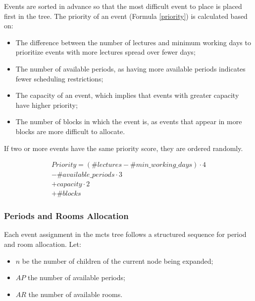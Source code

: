 Events are sorted in advance so that the most difficult event to place is placed first in the tree. The priority of an event (Formula \ref{priority}) is calculated based on:

\begin{itemize}
\item The difference between the number of lectures and minimum working days to prioritize events with more lectures spread over fewer days;
\item The number of available periods, as having more available periods indicates fewer scheduling restrictions;
\item The capacity of an event, which implies that events with greater capacity have higher priority;
\item The number of blocks in which the event is, as events that appear in more blocks are more difficult to allocate.
\end{itemize}

If two or more events have the same priority score, they are ordered randomly.

\begin{equation}
  \begin{aligned}
	Priority = (\#lectures - \#min\_working\_days) \cdot 4 \\
	           - \#available\_periods \cdot 3 \\
	          + capacity \cdot 2 \\
	          + \#blocks\label{priority}
  \end{aligned}
\end{equation}


\subsubsection{Periods and Rooms Allocation}

Each event assignment in the \ac{mcts} tree follows a structured sequence for period and room allocation. Let:
\begin{itemize}
\item \(n\) be the number of children of the current node being expanded;
\item \(AP\) the number of available periods;
\item \(AR\) the number of available rooms. 

\end{itemize}

